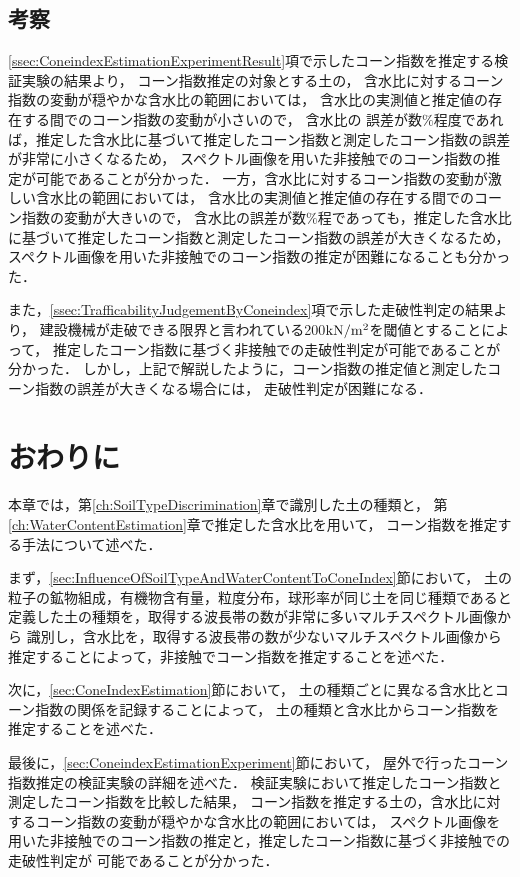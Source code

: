 \clearpage

\subsection{考察}
\label{ssec:ConeindexEstimationExperimentConsideration}

\ref{ssec:ConeindexEstimationExperimentResult}項で示したコーン指数を推定する検証実験の結果より，
コーン指数推定の対象とする土の，
含水比に対するコーン指数の変動が穏やかな含水比の範囲においては，
含水比の実測値と推定値の存在する間でのコーン指数の変動が小さいので，
含水比の
誤差が数$\%$程度であれば，推定した含水比に基づいて推定したコーン指数と測定したコーン指数の誤差が非常に小さくなるため，
スペクトル画像を用いた非接触でのコーン指数の推定が可能であることが分かった．
一方，含水比に対するコーン指数の変動が激しい含水比の範囲においては，
含水比の実測値と推定値の存在する間でのコーン指数の変動が大きいので，
含水比の誤差が数$\%$程であっても，推定した含水比に基づいて推定したコーン指数と測定したコーン指数の誤差が大きくなるため，
スペクトル画像を用いた非接触でのコーン指数の推定が困難になることも分かった．

また，\ref{ssec:TrafficabilityJudgementByConeindex}項で示した走破性判定の結果より，
建設機械が走破できる限界と言われている200${\rm kN/m^2}$を閾値とすることによって，
推定したコーン指数に基づく非接触での走破性判定が可能であることが分かった．
しかし，上記で解説したように，コーン指数の推定値と測定したコーン指数の誤差が大きくなる場合には，
走破性判定が困難になる．

\clearpage


\section{おわりに}

本章では，第\ref{ch:SoilTypeDiscrimination}章で識別した土の種類と，
第\ref{ch:WaterContentEstimation}章で推定した含水比を用いて，
コーン指数を推定する手法について述べた．

まず，\ref{sec:InfluenceOfSoilTypeAndWaterContentToConeIndex}節において，
土の粒子の鉱物組成，有機物含有量，粒度分布，球形率が同じ土を同じ種類であると定義した土の種類を，取得する波長帯の数が非常に多いマルチスペクトル画像から
識別し，含水比を，取得する波長帯の数が少ないマルチスペクトル画像から推定することによって，非接触でコーン指数を推定することを述べた．

次に，\ref{sec:ConeIndexEstimation}節において，
土の種類ごとに異なる含水比とコーン指数の関係を記録することによって，
土の種類と含水比からコーン指数を推定することを述べた．

最後に，\ref{sec:ConeindexEstimationExperiment}節において，
屋外で行ったコーン指数推定の検証実験の詳細を述べた．
検証実験において推定したコーン指数と測定したコーン指数を比較した結果，
コーン指数を推定する土の，含水比に対するコーン指数の変動が穏やかな含水比の範囲においては，
スペクトル画像を用いた非接触でのコーン指数の推定と，推定したコーン指数に基づく非接触での走破性判定が
可能であることが分かった．

\newpage
